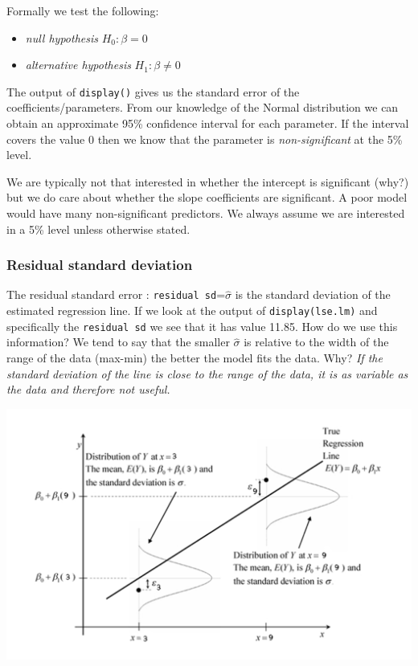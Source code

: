 \documentclass[
]{gitbook}
\providecommand{\tightlist}{%
  \setlength{\itemsep}{0pt}\setlength{\parskip}{0pt}}
\begin{document}
Formally we test the following:

\begin{itemize}
\tightlist
\item
  \emph{null hypothesis} \(H_0: \beta = 0\)
\item
  \emph{alternative hypothesis} \(H_1: \beta \neq 0\)
\end{itemize}

The output of \texttt{display()} gives us the standard error of the coefficients/parameters. From our knowledge of the Normal distribution we can obtain an approximate 95\% confidence interval for each parameter. If the interval covers the value 0 then we know that the parameter is \emph{non-significant} at the 5\% level.

We are typically not that interested in whether the intercept is significant (why?) but we do care about whether the slope coefficients are significant. A poor model would have many non-significant predictors. We always assume we are interested in a 5\% level unless otherwise stated.


\hypertarget{residual-standard-deviation}{%
\subsubsection{Residual standard deviation}\label{residual-standard-deviation}}

The residual standard error : \texttt{residual\ sd}=\(\hat{\sigma}\) is the standard deviation of the estimated regression line. If we look at the output of \texttt{display(lse.lm)} and specifically the \texttt{residual\ sd} we see that it has value 11.85. How do we use this information? We tend to say that the smaller \(\hat{\sigma}\) is relative to the width of the range of the data (max-min) the better the model fits the data. Why? \emph{If the standard deviation of the line is close to the range of the data, it is as variable as the data and therefore not useful.}

\includegraphics[width=15.03in]{res.std.err}
\end{document}
